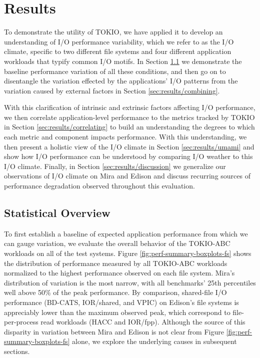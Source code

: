 \section{Results} \label{sec:results}

To demonstrate the utility of TOKIO, we have applied it to develop an understanding of I/O performance variability, which we refer to as the I/O climate, specific to two different file systems and four different application workloads that typify common I/O motifs.
In Section \ref{sec:results/overview} we demonstrate the baseline performance variation of all these conditions, and then go on to disentangle the variation effected by the applications' I/O patterns from the
variation caused by external factors in Section \ref{sec:results/combining}.

With this clarification of intrinsic and extrinsic factors affecting I/O performance, we then correlate application-level performance to the metrics tracked by TOKIO in Section \ref{sec:results/correlating} to build an understanding the degrees to which each metric and component impacts performance.
With this understanding, we then present a holistic view of the I/O climate in Section \ref{sec:results/umami} and show how I/O performance can be understood by comparing I/O weather to this I/O climate.
Finally, in Section \ref{sec:results/discussion} we generalize our observations of I/O climate on Mira and Edison and discuss recurring sources of performance degradation observed throughout this evaluation.

\subsection{Statistical Overview} \label{sec:results/overview}

To first establish a baseline of expected application performance from which we can gauge variation, we evaluate the overall behavior of the TOKIO-ABC workloads on all of the test systems.
Figure \ref{fig:perf-summary-boxplots-fs} shows the distribution of performance measured by all TOKIO-ABC workloads normalized to the highest performance observed on each file system.
Mira's distribution of variation is the most narrow, with all benchmarks' 25th percentiles well above 50\% of the peak performance.
By comparison, shared-file I/O performance (BD-CATS, IOR/shared, and VPIC) on Edison's file systems is appreciably lower than the maximum observed peak, which correspond to file-per-process read workloads (HACC and IOR/fpp).
Although the source of this disparity in variation between Mira and Edison is not clear from Figure \ref{fig:perf-summary-boxplots-fs} alone, we explore the underlying causes in subsequent sections.

